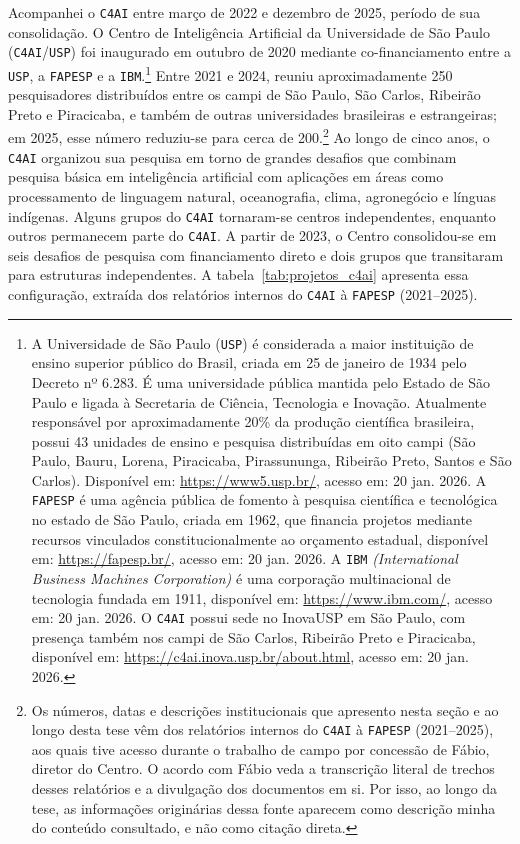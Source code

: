 Acompanhei o \texttt{C4AI} entre março de 2022 e dezembro de 2025, período de sua consolidação. O Centro de Inteligência Artificial da Universidade de São Paulo (\texttt{C4AI}/\texttt{USP}) foi inaugurado em outubro de 2020 mediante co-financiamento entre a \texttt{USP}, a \texttt{FAPESP} e a \texttt{IBM}.\footnote{A Universidade de São Paulo (\texttt{USP}) é considerada a maior instituição de ensino superior público do Brasil, criada em 25 de janeiro de 1934 pelo Decreto nº 6.283. É uma universidade pública mantida pelo Estado de São Paulo e ligada à Secretaria de Ciência, Tecnologia e Inovação. Atualmente responsável por aproximadamente 20\% da produção científica brasileira, possui 43 unidades de ensino e pesquisa distribuídas em oito campi (São Paulo, Bauru, Lorena, Piracicaba, Pirassununga, Ribeirão Preto, Santos e São Carlos). Disponível em: \url{https://www5.usp.br/}, acesso em: 20 jan. 2026. A \texttt{FAPESP} é uma agência pública de fomento à pesquisa científica e tecnológica no estado de São Paulo, criada em 1962, que financia projetos mediante recursos vinculados constitucionalmente ao orçamento estadual, disponível em: \url{https://fapesp.br/}, acesso em: 20 jan. 2026. A \texttt{IBM} \textit{(International Business Machines Corporation)} é uma corporação multinacional de tecnologia fundada em 1911, disponível em: \url{https://www.ibm.com/}, acesso em: 20 jan. 2026. O \texttt{C4AI} possui sede no InovaUSP em São Paulo, com presença também nos campi de São Carlos, Ribeirão Preto e Piracicaba, disponível em: \url{https://c4ai.inova.usp.br/about.html}, acesso em: 20 jan. 2026.} Entre 2021 e 2024, reuniu aproximadamente 250 pesquisadores distribuídos entre os campi de São Paulo, São Carlos, Ribeirão Preto e Piracicaba, e também de outras universidades brasileiras e estrangeiras; em 2025, esse número reduziu-se para cerca de 200.\footnote{Os números, datas e descrições institucionais que apresento nesta seção e ao longo desta tese vêm dos relatórios internos do \texttt{C4AI} à \texttt{FAPESP} (2021--2025), aos quais tive acesso durante o trabalho de campo por concessão de Fábio, diretor do Centro. O acordo com Fábio veda a transcrição literal de trechos desses relatórios e a divulgação dos documentos em si. Por isso, ao longo da tese, as informações originárias dessa fonte aparecem como descrição minha do conteúdo consultado, e não como citação direta.} Ao longo de cinco anos, o \texttt{C4AI} organizou sua pesquisa em torno de grandes desafios que combinam pesquisa básica em inteligência artificial com aplicações em áreas como processamento de linguagem natural, oceanografia, clima, agronegócio e línguas indígenas. Alguns grupos do \texttt{C4AI} tornaram-se centros independentes, enquanto outros permanecem parte do \texttt{C4AI}. A partir de 2023, o Centro consolidou-se em seis desafios de pesquisa com financiamento direto e dois grupos que transitaram para estruturas independentes. A tabela~\ref{tab:projetos_c4ai} apresenta essa configuração, extraída dos relatórios internos do \texttt{C4AI} à \texttt{FAPESP} (2021--2025).

